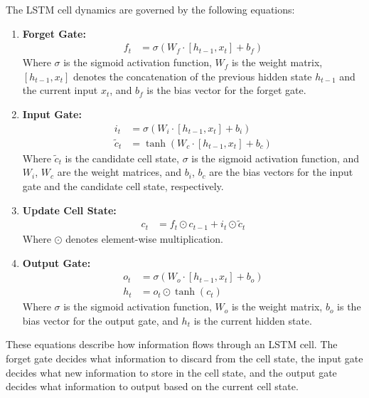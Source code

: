 \documentclass[a4paper]{report}
\begin{document}
{The LSTM cell dynamics are governed by the following equations:

\begin{enumerate}
    \item \textbf{Forget Gate:}
    \begin{align*}
        f_t &= \sigma(W_f \cdot [h_{t-1}, x_t] + b_f)
    \end{align*}
    Where $\sigma$ is the sigmoid activation function, $W_f$ is the weight matrix, $[h_{t-1}, x_t]$ denotes the concatenation of the previous hidden state $h_{t-1}$ and the current input $x_t$, and $b_f$ is the bias vector for the forget gate.
    
    \item \textbf{Input Gate:}
    \begin{align*}
        i_t &= \sigma(W_i \cdot [h_{t-1}, x_t] + b_i) \\
        \tilde{c}_t &= \tanh(W_c \cdot [h_{t-1}, x_t] + b_c)
    \end{align*}
    Where $\tilde{c}_t$ is the candidate cell state, $\sigma$ is the sigmoid activation function, and $W_i$, $W_c$ are the weight matrices, and $b_i$, $b_c$ are the bias vectors for the input gate and the candidate cell state, respectively.
    
    \item \textbf{Update Cell State:}
    \begin{align*}
        c_t &= f_t \odot c_{t-1} + i_t \odot \tilde{c}_t
    \end{align*}
    Where $\odot$ denotes element-wise multiplication.
    
    \item \textbf{Output Gate:}
    \begin{align*}
        o_t &= \sigma(W_o \cdot [h_{t-1}, x_t] + b_o) \\
        h_t &= o_t \odot \tanh(c_t)
    \end{align*}
    Where $\sigma$ is the sigmoid activation function, $W_o$ is the weight matrix, $b_o$ is the bias vector for the output gate, and $h_t$ is the current hidden state.
\end{enumerate}

These equations describe how information flows through an LSTM cell. The forget gate decides what information to discard from the cell state, the input gate decides what new information to store in the cell state, and the output gate decides what information to output based on the current cell state.

}
\end{document}
